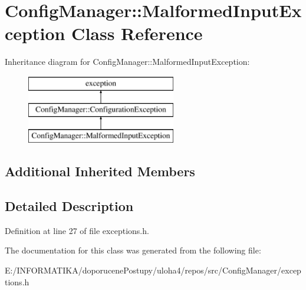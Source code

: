 \hypertarget{class_config_manager_1_1_malformed_input_exception}{}\section{Config\+Manager\+:\+:Malformed\+Input\+Exception Class Reference}
\label{class_config_manager_1_1_malformed_input_exception}
Inheritance diagram for Config\+Manager\+:\+:Malformed\+Input\+Exception\+:\begin{figure}[H]
\begin{center}
\leavevmode
\includegraphics[height=3.000000cm]{class_config_manager_1_1_malformed_input_exception}
\end{center}
\end{figure}
\subsection*{Additional Inherited Members}


\subsection{Detailed Description}


Definition at line 27 of file exceptions.\+h.



The documentation for this class was generated from the following file\+:\begin{DoxyCompactItemize}
\item 
E\+:/\+I\+N\+F\+O\+R\+M\+A\+T\+I\+K\+A/doporucene\+Postupy/uloha4/repos/src/\+Config\+Manager/exceptions.\+h\end{DoxyCompactItemize}
